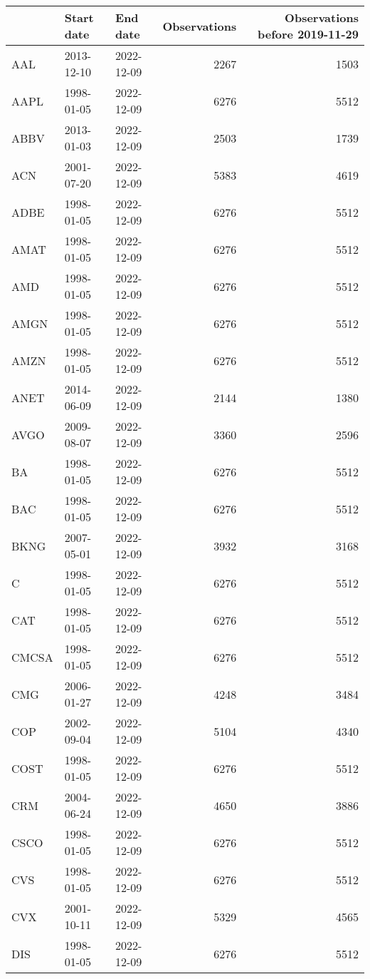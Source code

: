 \begin{table}[ht]
\centering
\begin{tabular}{lllrr}
  \hline
 & Start date & End date & Observations & Observations before 2019-11-29 \\ 
  \hline
AAL & 2013-12-10 & 2022-12-09 & 2267 & 1503 \\ 
  AAPL & 1998-01-05 & 2022-12-09 & 6276 & 5512 \\ 
  ABBV & 2013-01-03 & 2022-12-09 & 2503 & 1739 \\ 
  ACN & 2001-07-20 & 2022-12-09 & 5383 & 4619 \\ 
  ADBE & 1998-01-05 & 2022-12-09 & 6276 & 5512 \\ 
  AMAT & 1998-01-05 & 2022-12-09 & 6276 & 5512 \\ 
  AMD & 1998-01-05 & 2022-12-09 & 6276 & 5512 \\ 
  AMGN & 1998-01-05 & 2022-12-09 & 6276 & 5512 \\ 
  AMZN & 1998-01-05 & 2022-12-09 & 6276 & 5512 \\ 
  ANET & 2014-06-09 & 2022-12-09 & 2144 & 1380 \\ 
  AVGO & 2009-08-07 & 2022-12-09 & 3360 & 2596 \\ 
  BA & 1998-01-05 & 2022-12-09 & 6276 & 5512 \\ 
  BAC & 1998-01-05 & 2022-12-09 & 6276 & 5512 \\ 
  BKNG & 2007-05-01 & 2022-12-09 & 3932 & 3168 \\ 
  C & 1998-01-05 & 2022-12-09 & 6276 & 5512 \\ 
  CAT & 1998-01-05 & 2022-12-09 & 6276 & 5512 \\ 
  CMCSA & 1998-01-05 & 2022-12-09 & 6276 & 5512 \\ 
  CMG & 2006-01-27 & 2022-12-09 & 4248 & 3484 \\ 
  COP & 2002-09-04 & 2022-12-09 & 5104 & 4340 \\ 
  COST & 1998-01-05 & 2022-12-09 & 6276 & 5512 \\ 
  CRM & 2004-06-24 & 2022-12-09 & 4650 & 3886 \\ 
  CSCO & 1998-01-05 & 2022-12-09 & 6276 & 5512 \\ 
  CVS & 1998-01-05 & 2022-12-09 & 6276 & 5512 \\ 
  CVX & 2001-10-11 & 2022-12-09 & 5329 & 4565 \\ 
  DIS & 1998-01-05 & 2022-12-09 & 6276 & 5512 \\ 

\end{tabular}
\end{table}
